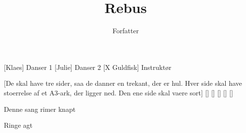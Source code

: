 \documentclass[a4paper,11pt]{article}
\title{Rebus}
\author{Forfatter}
\begin{document}
\maketitle

\begin{roles}  
[Klaes] Danser 1
[Julie] Danser 2
[X Guldfisk] Instruktør
\end{roles}

\begin{props}
  [De skal have tre sider, saa de danner en trekant, der er hul. Hver side skal have stoerrelse af et A3-ark, der ligger ned. Den ene side skal vaere sort]
  \prop{}[]
  \prop{}[]
  \prop{}[]
  \prop{}[]
  \prop{}[]
\end{props}

\begin{song}
   Denne sang rimer knapt

   Ringe agt

\end{song}
\end{document}
